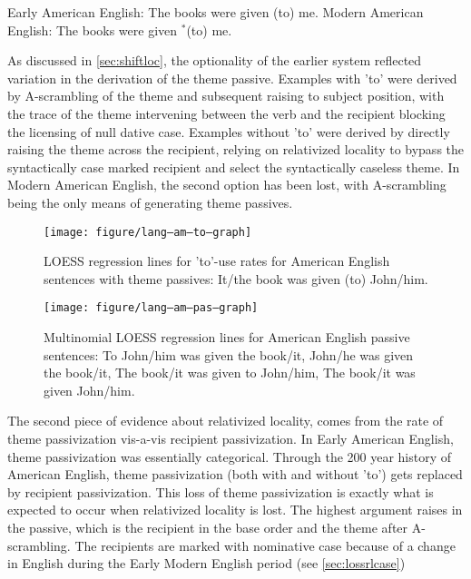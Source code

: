 \begin{exe}
\ex
\begin{xlist}
\ex Early American English: The books were given (to) me.
\ex Modern American English: The books were given $^{*}$(to) me.
\end{xlist}
\end{exe}

As discussed in \autoref{sec:shiftloc}, the optionality of the earlier system reflected variation in the derivation of the theme passive. Examples with 'to' were derived by A-scrambling of the theme and subsequent raising to subject position, with the trace of the theme intervening between the verb and the recipient blocking the licensing of null dative case. Examples without 'to' were derived by directly raising the theme across the recipient, relying on relativized locality to bypass the syntactically case marked recipient and select the syntactically caseless theme. In Modern American English, the second option has been lost, with A-scrambling being the only means of generating theme passives.











\begin{figure}
{\centering \texttt{[image: figure/lang--am--to--graph]} 

}
\caption[caption]{LOESS regression lines for 'to'-use rates for American English sentences with theme passives: \textcolor{col4}{It/the book was given (to) John/him}.}
\label{fig:am--act}

{\centering \texttt{[image: figure/lang--am--pas--graph]} 

}
\caption[caption]{Multinomial LOESS regression lines for American English passive sentences: \textcolor{col1}{To John/him was given the book/it}, \textcolor{col2}{John/he was given the book/it}, \textcolor{col3}{The book/it was given to John/him}, \textcolor{col4}{The book/it was given John/him}.}
\label{fig:am--pas}

\end{figure}

The second piece of evidence about relativized locality, comes from the rate of theme passivization vis-a-vis recipient passivization. In Early American English, theme passivization was essentially categorical. Through the 200 year history of American English, theme passivization (both with and without 'to') gets replaced by recipient passivization. This loss of theme passivization is exactly what is expected to occur when relativized locality is lost. The highest argument raises in the passive, which is the recipient in the base order and the theme after A-scrambling. The recipients are marked with nominative case because of a change in English during the Early Modern English period (see \autoref{sec:lossrlcase})

